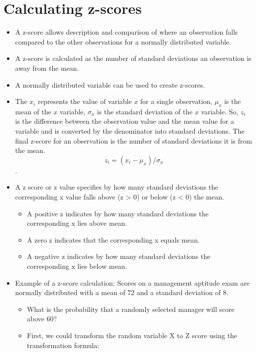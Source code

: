 \documentclass[
  letterpaper,
  DIV=11,
  numbers=noendperiod]{scrreprt}
\providecommand{\tightlist}{%
  \setlength{\itemsep}{0pt}\setlength{\parskip}{0pt}}\usepackage{longtable,booktabs,array}
\begin{document}
\section{Calculating z-scores}\label{calculating-z-scores}

\begin{itemize}
\item
  A z-score allows description and comparison of where an observation
  falls compared to the other observations for a normally distributed
  variable.
\item
  A z-score is calculated as the number of standard deviations an
  observation is away from the mean.
\item
  A normally distributed variable can be used to create z-scores.
\item
  The \(x_i\) represents the value of variable \(x\) for a single
  observation, \(\mu_x\) is the mean of the \(x\) variable, \(\sigma_x\)
  is the standard deviation of the \(x\) variable. So, \(z_i\) is the
  difference between the observation value and the mean value for a
  variable and is converted by the denominator into standard deviations.
  The final z-score for an observation is the number of standard
  deviations it is from the mean. \[z_i = (x_i - \mu_x)/\sigma_x\].
\item
  A z score or z value specifies by how many standard deviations the
  corresponding x value falls above (z \textgreater{} 0) or below (z
  \textless{} 0) the mean.

  \begin{itemize}
  \tightlist
  \item
    A positive z indicates by how many standard deviations the
    corresponding x lies above mean.
  \item
    A zero z indicates that the corresponding x equals mean.
  \item
    A negative z indicates by how many standard deviations the
    corresponding x lies below mean.
  \end{itemize}
\item
  Example of a z-score calculation: Scores on a management aptitude exam
  are normally distributed with a mean of 72 and a standard deviation of
  8.

  \begin{itemize}
  \tightlist
  \item
    What is the probability that a randomly selected manager will score
    above 60?
  \item
    First, we could transform the random variable X to Z score using the
    transformation formula:
  \end{itemize}
\end{itemize}
\end{document}
